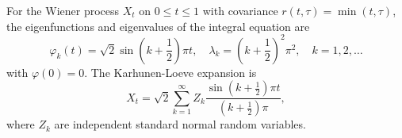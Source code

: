 For the Wiener process $X_t$ on $0 \leq t \leq 1$ with covariance $r(t,\tau) = \min(t,\tau)$, the eigenfunctions and eigenvalues of the integral equation are
$$\varphi_k(t) = \sqrt{2} \sin\left(k + \frac{1}{2}\right)\pi t, \quad \lambda_k = \left(k + \frac{1}{2}\right)^2 \pi^2, \quad k = 1, 2, \ldots$$
with $\varphi(0) = 0$. The Karhunen-Loeve expansion is
$$X_t = \sqrt{2} \sum_{k=1}^{\infty} Z_k \frac{\sin (k + \frac{1}{2}) \pi t}{(k + \frac{1}{2}) \pi},$$
where $Z_k$ are independent standard normal random variables.
